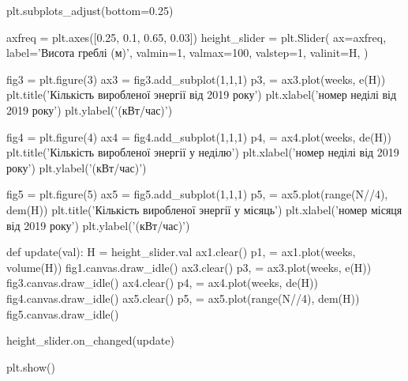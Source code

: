 \documentclass[12pt]{article}
\numberwithin{equation}{section}
\numberwithin{figure}{section}
\begin{document}
\begin{pythoncode}
plt.subplots_adjust(bottom=0.25)

axfreq = plt.axes([0.25, 0.1, 0.65, 0.03])
height_slider = plt.Slider(
    ax=axfreq,
    label='Висота греблі (м)',
    valmin=1,
    valmax=100,
    valstep=1,
    valinit=H,
)

fig3 = plt.figure(3)
ax3 = fig3.add_subplot(1,1,1)
p3, = ax3.plot(weeks, e(H))
plt.title('Кількість виробленої энергії від 2019 року')
plt.xlabel('номер неділі від 2019 року')
plt.ylabel('(кВт/час)')

fig4 = plt.figure(4)
ax4 = fig4.add_subplot(1,1,1)
p4, = ax4.plot(weeks, de(H))
plt.title('Кількість виробленої энергії у неділю')
plt.xlabel('номер неділі від 2019 року')
plt.ylabel('(кВт/час)')

fig5 = plt.figure(5)
ax5 = fig5.add_subplot(1,1,1)
p5, = ax5.plot(range(N//4), dem(H))
plt.title('Кількість виробленої энергії у місяць')
plt.xlabel('номер місяця від 2019 року')
plt.ylabel('(кВт/час)')


def update(val):
    H = height_slider.val
    ax1.clear()
    p1, = ax1.plot(weeks, volume(H))
    fig1.canvas.draw_idle()
    ax3.clear()
    p3, = ax3.plot(weeks, e(H))
    fig3.canvas.draw_idle()
    ax4.clear()
    p4, = ax4.plot(weeks, de(H))
    fig4.canvas.draw_idle()
    ax5.clear()
    p5, = ax5.plot(range(N//4), dem(H))
    fig5.canvas.draw_idle()


height_slider.on_changed(update)

plt.show()
\end{pythoncode}
\end{document}
